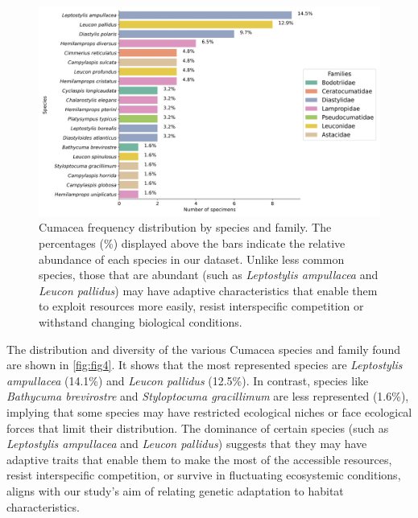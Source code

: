 \begin{figure}[htbp]
    \centering
    \includegraphics[width=\textwidth]{figure2.jpg}
    \caption{Cumacea frequency distribution by species and family. The percentages (\%) displayed above the bars indicate the relative abundance of each species in our dataset. Unlike less common species, those that are abundant (such as \emph{Leptostylis ampullacea} and \emph{Leucon pallidus}) may have adaptive characteristics that enable them to exploit resources more easily, resist interspecific competition or withstand changing biological conditions. \label{fig:fig4}}
\end{figure}

The distribution and diversity of the various Cumacea species and family found are shown in \autoref{fig:fig4}. It shows that the most represented species are \emph{Leptostylis ampullacea} (14.1\%) and \emph{Leucon pallidus} (12.5\%). In contrast, species like \emph{Bathycuma brevirostre} and \emph{Styloptocuma gracillimum} are less represented (1.6\%), implying that some species may have restricted ecological niches or face ecological forces that limit their distribution. The dominance of certain species (such as \emph{Leptostylis ampullacea} and \emph{Leucon pallidus}) suggests that they may have adaptive traits that enable them to make the most of the accessible resources, resist interspecific competition, or survive in fluctuating ecosystemic conditions, aligns with our study’s aim of relating genetic adaptation to habitat characteristics.

